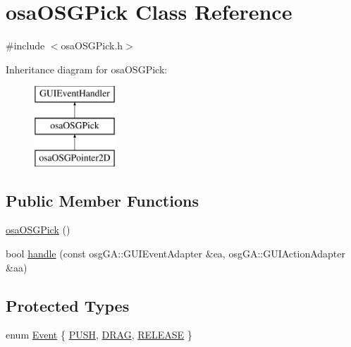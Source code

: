 \hypertarget{classosa_o_s_g_pick}{}\section{osa\+O\+S\+G\+Pick Class Reference}
\label{classosa_o_s_g_pick}


{\ttfamily \#include $<$osa\+O\+S\+G\+Pick.\+h$>$}

Inheritance diagram for osa\+O\+S\+G\+Pick\+:\begin{figure}[H]
\begin{center}
\leavevmode
\includegraphics[height=3.000000cm]{d4/da0/classosa_o_s_g_pick}
\end{center}
\end{figure}
\subsection*{Public Member Functions}
\begin{DoxyCompactItemize}
\item 
\hyperlink{classosa_o_s_g_pick_a16d9b31f163a44fea8d098398da6a797}{osa\+O\+S\+G\+Pick} ()
\item 
bool \hyperlink{classosa_o_s_g_pick_a35a6dbbce50857efc81da9a8e0ff8340}{handle} (const osg\+G\+A\+::\+G\+U\+I\+Event\+Adapter \&ea, osg\+G\+A\+::\+G\+U\+I\+Action\+Adapter \&aa)
\end{DoxyCompactItemize}
\subsection*{Protected Types}
\begin{DoxyCompactItemize}
\item 
enum \hyperlink{classosa_o_s_g_pick_af50ae1a966b6f3282b707d73f87081d8}{Event} \{ \hyperlink{classosa_o_s_g_pick_af50ae1a966b6f3282b707d73f87081d8a79bd268c21a59826c7f515485984076a}{P\+U\+S\+H}, 
\hyperlink{classosa_o_s_g_pick_af50ae1a966b6f3282b707d73f87081d8a8f7bf352f87b9fd779b883e8b0457ad4}{D\+R\+A\+G}, 
\hyperlink{classosa_o_s_g_pick_af50ae1a966b6f3282b707d73f87081d8a209c4a4545061ed9e9ec0fbe2d86953d}{R\+E\+L\+E\+A\+S\+E}
 \}
\end{DoxyCompactItemize}

